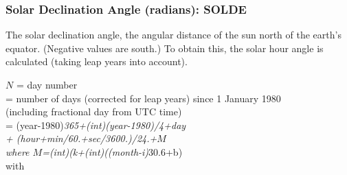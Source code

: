 \documentclass[
  english,
]{book}
\begin{document}
\hypertarget{solde}{%
\subsubsection*{Solar Declination Angle (radians): SOLDE}\label{solde}}

The solar declination angle, the angular distance of the sun north of
the earth's equator. (Negative values are south.) To obtain this, the
solar hour angle is calculated (taking leap years into account).

\(N\) = day number\\
\hspace*{0.333em}\hspace*{0.333em}\hspace*{0.333em}\hspace*{0.333em}=
number of days (corrected for leap years) since 1 January 1980\\
\hspace*{0.333em}\hspace*{0.333em}\hspace*{0.333em}\hspace*{0.333em}\hspace*{0.333em}\hspace*{0.333em}\hspace*{0.333em}(including
fractional day from UTC time)\\
\hspace*{0.333em}\hspace*{0.333em}\hspace*{0.333em}=
(year-1980)\emph{365+(int)(year-1980)/4+day\\
\hspace*{0.333em}\hspace*{0.333em}\hspace*{0.333em}\hspace*{0.333em}\hspace*{0.333em}\hspace*{0.333em}+
(hour+min/60.+sec/3600.)/24.+\(M\)\\
\hspace*{0.333em}\hspace*{0.333em}\hspace*{0.333em}where
\(M\)=(int)(k+(int)((month-i)}30.6+b)\\
\hspace*{0.333em}\hspace*{0.333em}\hspace*{0.333em}\hspace*{0.333em}\hspace*{0.333em}\hspace*{0.333em}with
\end{document}
